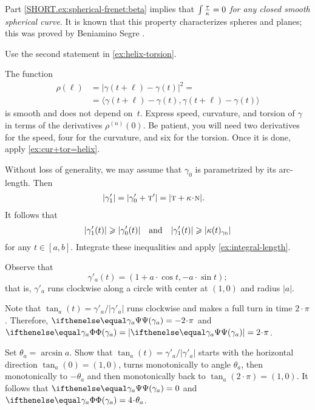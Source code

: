 \begin{multicols}{2}
Part \ref{SHORT.ex:spherical-frenet:beta} implies that \textit{$\int\tfrac{\tau}{\kappa}=0$ for any closed smooth spherical curve}.
It is known that this property characterizes spheres and planes; this was proved by Beniamino Segre \cite{segre}.

 Use the second statement in \ref{ex:helix-torsion}.

 The function
\begin{align*}
\rho(\ell)&=|\gamma(t+\ell)-\gamma(t)|^2=
\\
&=\langle \gamma(t+\ell)-\gamma(t),\gamma(t+\ell)-\gamma(t)\rangle
\end{align*}
is smooth and does not depend on~$t$.
Express speed, curvature, and torsion of $\gamma$ in terms of the derivatives $\rho^{(n)}(0)$.
Be patient, you will need two derivatives for the speed,
four for the curvature,
and six for the torsion.
Once it is done, apply \ref{ex:cur+tor=helix}.


\setcounter{eqtn}{0}



Without loss of generality, we may assume that $\gamma_0$ is parametrized by its arc-length.
Then
\begin{align*}
|\gamma_1'|&=|\gamma_0'+\tan'|=|\tan+\kur\cdot\norm|.
\end{align*}
It follows that
\[|\gamma_1'(t)|\geqslant|\gamma_0'(t)|
\quad\text{and}\quad
|\gamma_1'(t)|\geqslant|\kappa(t)_{\gamma_0}|
\]
for any $t\in[a,b]$.
Integrate these inequalities and apply 
\ref{ex:integral-length}.


Observe that 
\[\gamma'_a(t)=(1+a\cdot \cos t, -a\cdot \sin t);\]
that is, $\gamma'_a$ runs clockwise along a circle with center at $(1,0)$ and radius $\vert a \vert$.

 Note that $\tan_a(t)=\gamma'_a/|\gamma'_a|$ runs clockwise and makes a full turn in time $2\cdot\pi$.
Therefore, $\tgc{\gamma_a}=-2\cdot\pi$ and $\tc{\gamma_a}\z=|\tgc{\gamma_a}|=2\cdot\pi$.

Set $\theta_a=\arcsin a$.
Show that $\tan_a(t)=\gamma'_a/|\gamma'_a|$ starts with the horizontal direction $\tan_a(0)=(1,0)$, turns monotonically to angle $\theta_a$, then monotonically to $-\theta_a$ and then monotonically back to $\tan_a(2\cdot\pi)=(1,0)$.
It follows that 
$\tgc{\gamma_a}=0$ and $\tc{\gamma_a}=4\cdot\theta_a$.


\end{multicols}
